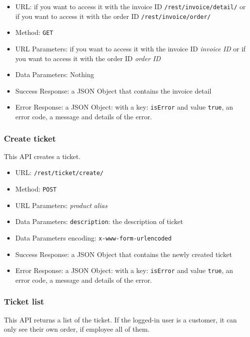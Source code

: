 \begin{itemize}
    \item URL: if you want to access it with the invoice ID \texttt{/rest/invoice/detail/} or if you want to access it with the order ID \texttt{/rest/invoice/order/}
    \item Method: \texttt{GET}
    \item URL Parameters: if you want to access it with the invoice ID \textit{invoice ID} or if you want to access it with the order ID \textit{order ID}
    \item Data Parameters: Nothing
    \item Success Response: a JSON Object that contains the invoice detail
    \item Error Response: a JSON Object: with a key: \texttt{isError}  and value \texttt{true}, an error code, a message and details of the error.
\end{itemize}

\subsubsection*{Create ticket}

This API creates a ticket.

\begin{itemize}
    \item URL: \texttt{/rest/ticket/create/}
    \item Method: \texttt{POST}
    \item URL Parameters: \textit{product alias}
    \item Data Parameters: \texttt{description}: the description of ticket
    \item Data Parameters encoding: \texttt{x-www-form-urlencoded}
    \item Success Response: a JSON Object that contains the newly created ticket
    \item Error Response: a JSON Object: with a key: \texttt{isError}  and value \texttt{true}, an error code, a message and details of the error.
\end{itemize}

\subsubsection*{Ticket list}

This API returns a list of the ticket.
If the logged-in user is a customer, it can only see their own order, if employee all of them.


